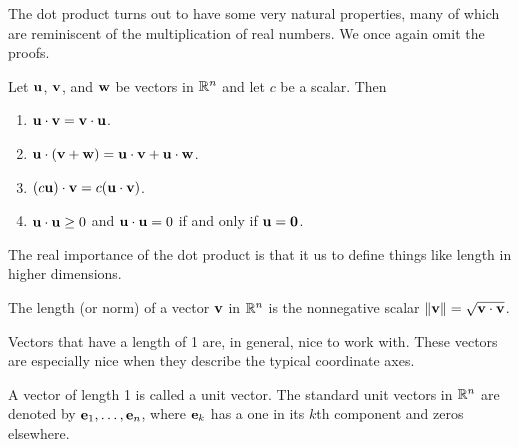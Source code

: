 \documentclass[../m073main.tex]{subfiles}
\begin{document}
The dot product turns out to have some very natural properties, many of which are reminiscent of the multiplication of real numbers.
We once again omit the proofs.

\begin{theorem}
	Let $\mathbf{u}$, $\mathbf{v}$, and $\mathbf{w}$ be vectors in $\mathbb{R}^n$ and let $c$ be a scalar.
	Then
	\begin{enumerate}[label=(\alph*)]
		\item $\mathbf{u} \cdot \mathbf{v} = \mathbf{v} \cdot \mathbf{u}$.
		\item $\mathbf{u} \cdot (\mathbf{v} + \mathbf{w}) = \mathbf{u} \cdot \mathbf{v} + \mathbf{u} \cdot \mathbf{w}$.
		\item $(c \mathbf{u}) \cdot \mathbf{v} = c(\mathbf{u} \cdot \mathbf{v})$.
		\item $\mathbf{u} \cdot \mathbf{u} \geq 0$ and $\mathbf{u} \cdot \mathbf{u} = 0$ if and only if $\mathbf{u} = \mathbf{0}$.
	\end{enumerate}
\end{theorem}

The real importance of the dot product is that it us to define things like length in higher dimensions.

\begin{definition}[Length]
	The length (or norm) of a vector $\mathbf{v}$ in $\mathbb{R}^n$ is the nonnegative scalar $\|\mathbf{v}\| = \sqrt{\mathbf{v} \cdot \mathbf{v}}$.
\end{definition}

Vectors that have a length of 1 are, in general, nice to work with.
These vectors are especially nice when they describe the typical coordinate axes.

\begin{definition}
	A vector of length 1 is called a unit vector.
	The standard unit vectors in $\mathbb{R}^n$ are denoted by $\mathbf{e}_1, \ldots, \mathbf{e}_n$,
	where $\mathbf{e}_k$ has a one in its $k$th component and zeros elsewhere.

\end{definition}
\end{document}
